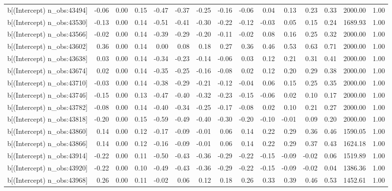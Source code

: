 \begin{table}[ht]
\begin{tabular}{rrrrrrrrrrrrrrr}
  b[(Intercept) n\_obs:43494] & -0.06 & 0.00 & 0.15 & -0.47 & -0.37 & -0.25 & -0.16 & -0.06 & 0.04 & 0.13 & 0.23 & 0.33 & 2000.00 & 1.00 \\ 
  b[(Intercept) n\_obs:43530] & -0.13 & 0.00 & 0.14 & -0.51 & -0.41 & -0.30 & -0.22 & -0.12 & -0.03 & 0.05 & 0.15 & 0.24 & 1689.93 & 1.00 \\ 
  b[(Intercept) n\_obs:43566] & -0.02 & 0.00 & 0.14 & -0.39 & -0.29 & -0.20 & -0.11 & -0.02 & 0.08 & 0.16 & 0.25 & 0.32 & 2000.00 & 1.00 \\ 
  b[(Intercept) n\_obs:43602] & 0.36 & 0.00 & 0.14 & 0.00 & 0.08 & 0.18 & 0.27 & 0.36 & 0.46 & 0.53 & 0.63 & 0.71 & 2000.00 & 1.00 \\ 
  b[(Intercept) n\_obs:43638] & 0.03 & 0.00 & 0.14 & -0.34 & -0.23 & -0.14 & -0.06 & 0.03 & 0.12 & 0.21 & 0.31 & 0.41 & 2000.00 & 1.00 \\ 
  b[(Intercept) n\_obs:43674] & 0.02 & 0.00 & 0.14 & -0.35 & -0.25 & -0.16 & -0.08 & 0.02 & 0.12 & 0.20 & 0.29 & 0.38 & 2000.00 & 1.00 \\ 
  b[(Intercept) n\_obs:43710] & -0.03 & 0.00 & 0.14 & -0.38 & -0.29 & -0.21 & -0.12 & -0.04 & 0.06 & 0.15 & 0.25 & 0.35 & 2000.00 & 1.00 \\ 
  b[(Intercept) n\_obs:43746] & -0.15 & 0.00 & 0.13 & -0.47 & -0.40 & -0.32 & -0.23 & -0.15 & -0.06 & 0.02 & 0.10 & 0.17 & 2000.00 & 1.00 \\ 
  b[(Intercept) n\_obs:43782] & -0.08 & 0.00 & 0.14 & -0.40 & -0.34 & -0.25 & -0.17 & -0.08 & 0.02 & 0.10 & 0.21 & 0.27 & 2000.00 & 1.00 \\ 
  b[(Intercept) n\_obs:43818] & -0.20 & 0.00 & 0.15 & -0.59 & -0.49 & -0.40 & -0.30 & -0.20 & -0.10 & -0.01 & 0.09 & 0.20 & 2000.00 & 1.00 \\ 
  b[(Intercept) n\_obs:43860] & 0.14 & 0.00 & 0.12 & -0.17 & -0.09 & -0.01 & 0.06 & 0.14 & 0.22 & 0.29 & 0.36 & 0.46 & 1590.05 & 1.00 \\ 
  b[(Intercept) n\_obs:43866] & 0.14 & 0.00 & 0.12 & -0.16 & -0.09 & -0.01 & 0.06 & 0.14 & 0.22 & 0.29 & 0.37 & 0.43 & 1624.18 & 1.00 \\ 
  b[(Intercept) n\_obs:43914] & -0.22 & 0.00 & 0.11 & -0.50 & -0.43 & -0.36 & -0.29 & -0.22 & -0.15 & -0.09 & -0.02 & 0.06 & 1519.89 & 1.00 \\ 
  b[(Intercept) n\_obs:43920] & -0.22 & 0.00 & 0.10 & -0.49 & -0.43 & -0.36 & -0.29 & -0.22 & -0.15 & -0.09 & -0.02 & 0.04 & 1386.36 & 1.00 \\ 
  b[(Intercept) n\_obs:43968] & 0.26 & 0.00 & 0.11 & -0.02 & 0.06 & 0.12 & 0.18 & 0.26 & 0.33 & 0.39 & 0.46 & 0.53 & 1452.61 & 1.00 \\ 

\end{tabular}
\end{table}
